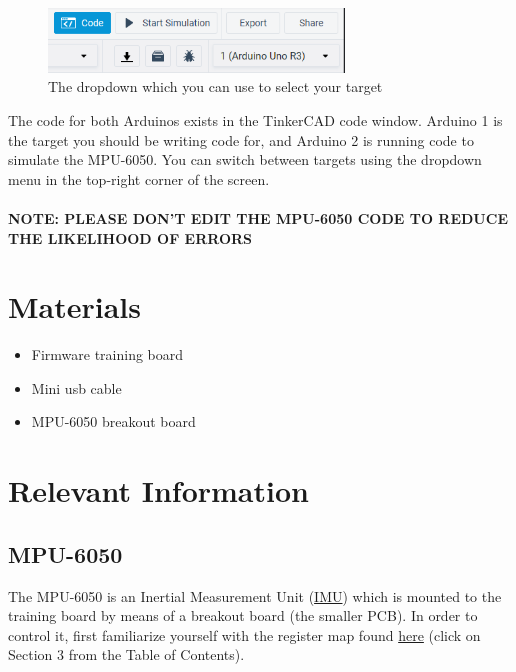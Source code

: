 \documentclass{article}
\begin{document}
        \begin{figure}[ht]
            \centering
            \includegraphics[width = 0.7\textwidth]{img/TinkerCadCode.PNG}
            \caption{The dropdown which you can use to select your target}
        \end{figure}
        
        The code for both Arduinos exists in the TinkerCAD code window. Arduino 1 is the target you should be writing code for, and Arduino 2 is running code to simulate the MPU-6050. You can switch between targets using the dropdown menu in the top-right corner of the screen. 
        \\ \\
        \textbf{NOTE: PLEASE DON'T EDIT THE MPU-6050 CODE TO REDUCE THE LIKELIHOOD OF ERRORS}
        
        \clearpage
        
\section{Materials}
\begin{itemize}
	\item Firmware training board
	\item Mini usb cable
	\item MPU-6050 breakout board
\end{itemize}

\section{Relevant Information}
    \subsection{MPU-6050} \label{readwrite}
        The MPU-6050 is an Inertial Measurement Unit (\href{https://en.wikipedia.org/wiki/Inertial_measurement_unit}{IMU}) which is mounted to the training board by means of a breakout board (the smaller PCB).  
        In order to control it, first familiarize yourself with the register map found \href{https://cdn.sparkfun.com/datasheets/Sensors/Accelerometers/RM-MPU-6000A.pdf}{here} (click on Section 3 from the Table of Contents).
        
\end{document}
